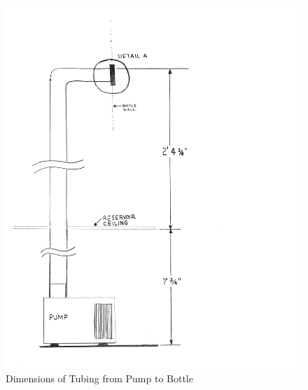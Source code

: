 \documentclass[12pt]{article}
\begin{document}
\begin{figure}[H]
    \centering
    \includegraphics[width=145mm]{resources/tubing-pump-to-bottle.png}
    \caption{Dimensions of Tubing from Pump to Bottle}
\end{figure}
\end{document}
